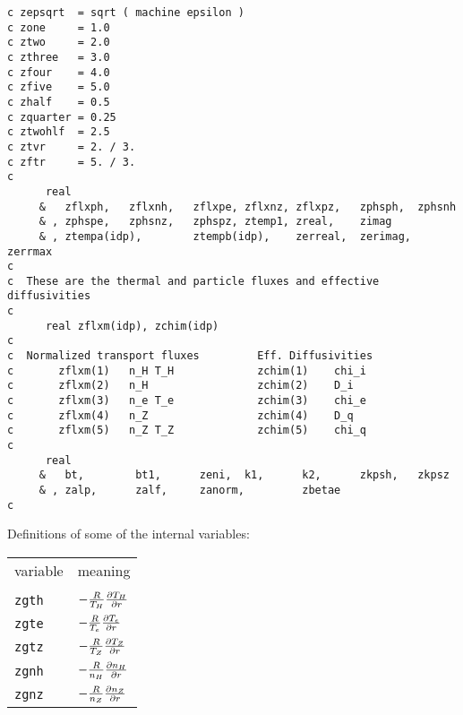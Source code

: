 \begin{verbatim}
c zepsqrt  = sqrt ( machine epsilon )
c zone     = 1.0
c ztwo     = 2.0
c zthree   = 3.0
c zfour    = 4.0
c zfive    = 5.0
c zhalf    = 0.5
c zquarter = 0.25
c ztwohlf  = 2.5
c ztvr     = 2. / 3.
c zftr     = 5. / 3.
c
      real 
     &   zflxph,   zflxnh,   zflxpe, zflxnz, zflxpz,   zphsph,  zphsnh
     & , zphspe,   zphsnz,   zphspz, ztemp1, zreal,    zimag   
     & , ztempa(idp),        ztempb(idp),    zerreal,  zerimag, zerrmax
c
c  These are the thermal and particle fluxes and effective diffusivities
c
      real zflxm(idp), zchim(idp)
c
c  Normalized transport fluxes         Eff. Diffusivities
c       zflxm(1)   n_H T_H             zchim(1)    chi_i                
c       zflxm(2)   n_H                 zchim(2)    D_i
c       zflxm(3)   n_e T_e             zchim(3)    chi_e
c       zflxm(4)   n_Z                 zchim(4)    D_q
c       zflxm(5)   n_Z T_Z             zchim(5)    chi_q
c
      real 
     &   bt,        bt1,      zeni,  k1,      k2,      zkpsh,   zkpsz
     & , zalp,      zalf,     zanorm,         zbetae
c
\end{verbatim}

Definitions of some of the internal variables:

\renewcommand{\arraystretch}{1.4}
\begin{center}
\begin{tabular}{lp{4.0in}}
variable & meaning \\
\\
{\tt zgth} & $ - \frac{R}{T_H} \frac{\partial T_H}{\partial r} $ \\
{\tt zgte} & $ - \frac{R}{T_e} \frac{\partial T_e}{\partial r} $ \\
{\tt zgtz} & $ - \frac{R}{T_Z} \frac{\partial T_Z}{\partial r} $ \\
{\tt zgnh} & $ - \frac{R}{n_H} \frac{\partial n_H}{\partial r} $ \\
{\tt zgnz} & $ - \frac{R}{n_Z} \frac{\partial n_Z}{\partial r} $ \\
\end{tabular}  \end{center}

